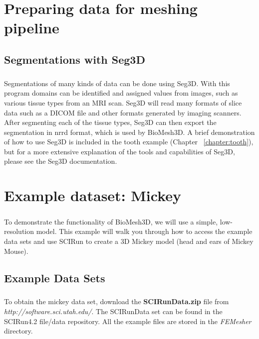 \documentclass[fleqn,12pt,openany]{book}
\begin{document}
\chapter{Preparing data for meshing pipeline}
\label{chapter:prep}

\section{Segmentations with Seg3D}

\paragraph{}
Segmentations of many kinds of data can be done using Seg3D.  With this program 
domains can be identified and assigned values from images, such as various 
tissue types from an MRI scan.  Seg3D will read many formats of slice data such 
as a DICOM file and other formats generated by imaging scanners.  After 
segmenting each of the tissue types, Seg3D can then export the segmentation in 
nrrd format, which is used by BioMesh3D.  A brief demonstration of how to use 
Seg3D is included in the tooth example (Chapter ~\ref{chapter:tooth}), but for 
a more extensive explanation of the tools and capabilities of Seg3D, please 
see the Seg3D documentation. 


\chapter{Example dataset: Mickey}
\label{chapter:mickey}
\paragraph{}
To demonstrate the functionality of BioMesh3D, we will use a simple, 
low-resolution model.  This example will walk you through how to access the 
example data sets and use SCIRun to create a 3D Mickey model (head and ears of Mickey Mouse).  

\section{Example Data Sets}
\paragraph{}
To obtain the mickey data set, download the {\bf SCIRunData.zip} file from
{\em http://software.sci.utah.edu/}. The SCIRunData set can be found in the 
SCIRun4.2 file/data repository. All the example files are stored in the
{\em FEMesher} directory.
\end{document}
